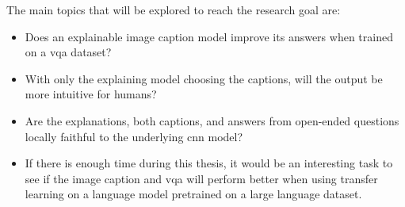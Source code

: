 The main topics that will be explored to reach the research goal are: 
\begin{itemize}
    \item Does an explainable image caption model improve its answers when trained on a \gls{vqa} dataset?
    \item With only the explaining model choosing the captions, will the output be more intuitive for humans?
    \item Are the explanations, both captions, and answers from open-ended questions locally faithful to the underlying \gls{cnn} model?
    \item If there is enough time during this thesis, it would be an interesting task to see if the image caption and \gls{vqa} will perform better when using transfer learning  on a language model pretrained on a large language dataset. 
\end{itemize}


